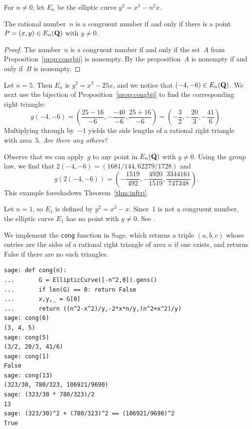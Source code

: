 For $n\neq 0$, let $E_n$ be the elliptic curve $y^2 = x^3 - n^2 x$.
\begin{proposition}%
%
  The rational number~$n$ is a congruent number if and only if
there is a point $P=(x,y)\in E_n(\mathbf{Q})$ with $y\neq 0$.
\end{proposition}
\begin{proof}
The number~$n$ is a congruent number if and only if the set~$A$ from
Proposition~\ref{prop:congbij} is nonempty.  By the proposition~$A$ is
nonempty if and only if~$B$ is nonempty.
\end{proof}

\begin{example}\label{ex:cong5}
Let $n=5$.  Then $E_n$ is $y^2=x^3-25x$, and we notice
that $(-4,-6)\in E_n(\mathbf{Q})$.  We next use the bijection
of Proposition~\ref{prop:congbij} to find the corresponding
right triangle:
$$
  g(-4,-6) = \left(\frac{25-16}{-6},-\frac{-40}{-6}, \frac{25+16}{-6}\right)
           = \left(-\frac{3}{2}, -\frac{20}{3}, -\frac{41}{6}\right).
$$
Multiplying through by~$-1$ yields the side lengths of a rational
right triangle with area~$5$.  {\em Are there any others?}

Observe that we can apply~$g$ to any point in $E_n(\mathbf{Q})$ with $y\neq 0$.
Using the group law, we find that $2(-4,-6) = (1681/144, 62279/1728)$
and
$$
  g(2(-4,-6)) = \left(
-\frac{1519}{492}, -\frac{4920}{1519}, \frac{3344161}{747348}
\right).
$$
This example foreshadows Theorem~\ref{thm:inftri}.
\end{example}

\begin{example}
Let $n=1$, so $E_1$ is defined by $y^2=x^3-x$.  Since~$1$ is not
a congruent number, the elliptic curve $E_1$ has no point
with $y\neq 0$.  See .
\end{example}

\begin{sg}
  We implement the {\tt cong} function in Sage, which returns a triple
  $(a,b,c)$ whose entries are the sides of a rational right triangle
  of area $n$ if one exists, and returns False if there are no such
  triangles.
\begin{verbatim}
sage: def cong(n):
...       G = EllipticCurve([-n^2,0]).gens()
...       if len(G) == 0: return False
...       x,y,_ = G[0]
...       return ((n^2-x^2)/y,-2*x*n/y,(n^2+x^2)/y)
sage: cong(6)
(3, 4, 5)
sage: cong(5)
(3/2, 20/3, 41/6)
sage: cong(1)
False
sage: cong(13)
(323/30, 780/323, 106921/9690)
sage: (323/30 * 780/323)/2
13
sage: (323/30)^2 + (780/323)^2 == (106921/9690)^2
True
\end{verbatim}
\end{sg}


